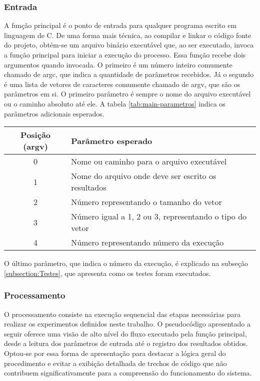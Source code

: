 \subsubsection{Entrada}
A função principal é o ponto de entrada para qualquer programa escrito em linguagem de C. De uma forma mais técnica, ao compilar e linkar o código fonte do projeto, obtém-se um arquivo binário executável que, ao ser executado, invoca a função principal para iniciar a execução do processo. Essa função recebe dois argumentos quando invocada. O primeiro é um número inteiro comumente chamado de argc, que indica a quantidade de parâmetros recebidos. Já o segundo é uma lista de vetores de caracteres comumente chamado de argv, que são os parâmetros em si. O primeiro parâmetro é sempre o nome do arquivo executável ou o caminho absoluto até ele. A tabela \ref{tab:main-parametros} indica os parâmetros adicionais esperados.
\begin{table}[H]
    \centering
    \begin{tabular}{ | c | l | }
        \hline
        Posição (argv) & Parâmetro esperado                                      \\
        \hline
        0              & Nome ou caminho para o arquivo executável               \\
        1              & Nome do arquivo onde deve ser escrito os resultados     \\
        2              & Número representando o tamanho do vetor                 \\
        3              & Número igual a 1, 2 ou 3, representando o tipo do vetor \\
        4              & Número representando número da execução                 \\
        \hline
    \end{tabular}
\end{table}

O último parâmetro, que indica o número da execução, é explicado na subseção \ref{subsection:Testes}, que apresenta como os testes foram executados.

\subsubsection{Processamento}
O processamento consiste na execução sequencial das etapas necessárias para realizar os experimentos definidos neste trabalho. O pseudocódigo apresentado a seguir oferece uma visão de alto nível do fluxo executado pela função principal, desde a leitura dos parâmetros de entrada até o registro dos resultados obtidos. Optou-se por essa forma de apresentação para destacar a lógica geral do procedimento e evitar a exibição detalhada de trechos de código que não contribuem significativamente para a compreensão do funcionamento do sistema.

